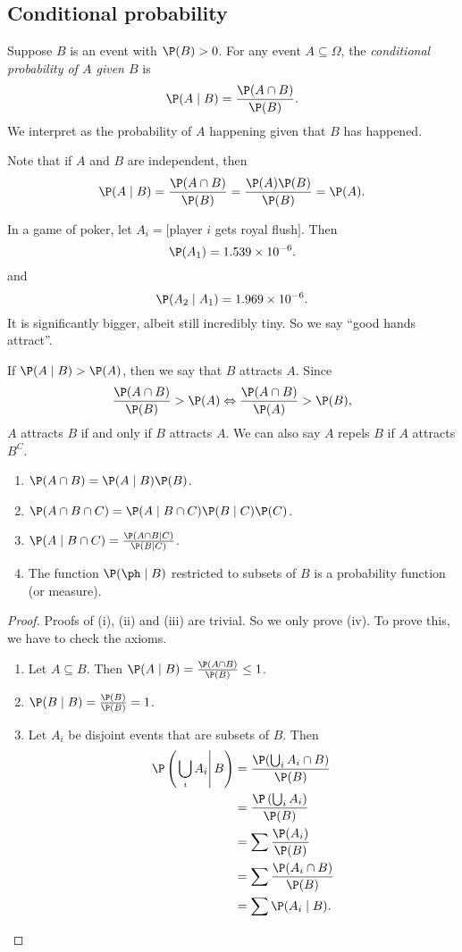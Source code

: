 \documentclass[a4paper]{article}
\begin{document}
\subsection{Conditional probability}
\begin{defi}
  Suppose $B$ is an event with $\P(B) > 0$. For any event $A\subseteq \Omega$, the \emph{conditional probability of $A$ given $B$} is
  \[
    \P(A\mid B) = \frac{\P(A\cap B)}{\P(B)}.
  \]
  We interpret as the probability of $A$ happening given that $B$ has happened.
\end{defi}
Note that if $A$ and $B$ are independent, then
\[
  \P(A\mid B) = \frac{\P(A\cap B)}{\P(B)} = \frac{\P(A)\P(B)}{\P(B)} = \P(A).
\]
\begin{eg}
  In a game of poker, let $A_i = [$player $i$ gets royal flush$]$. Then
  \[
    \P(A_1) = 1.539\times 10^{-6}.
  \]
  and
  \[
    \P(A_2\mid A_1) = 1.969\times 10^{-6}.
  \]
  It is significantly bigger, albeit still incredibly tiny. So we say ``good hands attract''.

  If $\P(A\mid B) > \P(A)$, then we say that $B$ attracts $A$. Since
  \[
    \frac{\P(A\cap B)}{\P(B)} > \P(A) \Leftrightarrow \frac{\P(A\cap B)}{\P(A)} > \P(B),
  \]
  $A$ attracts $B$ if and only if $B$ attracts $A$. We can also say $A$ repels $B$ if $A$ attracts $B^C$.
\end{eg}
\begin{thm}\leavevmode
  \begin{enumerate}
    \item $\P(A\cap B) = \P(A\mid B)\P(B)$.
    \item $\P(A\cap B\cap C) = \P(A\mid B\cap C) \P(B\mid C) \P(C)$.
    \item $\P(A\mid B\cap C) = \frac{\P(A\cap B\mid C)}{\P(B\mid C)}$.
    \item The function $\P(\ph \mid B)$ restricted to subsets of $B$ is a probability function (or measure).
  \end{enumerate}
\end{thm}
\begin{proof}
  Proofs of (i), (ii) and (iii) are trivial. So we only prove (iv). To prove this, we have to check the axioms.

  \begin{enumerate}
    \item Let $A\subseteq B$. Then $\P(A\mid B) = \frac{\P(A\cap B)}{\P(B)} \leq 1$.
    \item $\P(B\mid B) = \frac{\P(B)}{\P(B)} = 1$.
    \item Let $A_i$ be disjoint events that are subsets of $B$. Then
      \begin{align*}
        \P\left(\left.\bigcup_i A_i\right\vert B\right) &= \frac{\P(\bigcup_i A_i\cap B)}{\P(B)}\\
        &= \frac{\P\left(\bigcup_i A_i\right)}{\P(B)}\\
        &= \sum \frac{\P(A_i)}{\P(B)}\\
        &=\sum \frac{\P(A_i\cap B)}{\P(B)}\\
        &= \sum \P(A_i \mid B).\qedhere
      \end{align*}%
  \end{enumerate}
\end{proof}
\end{document}
